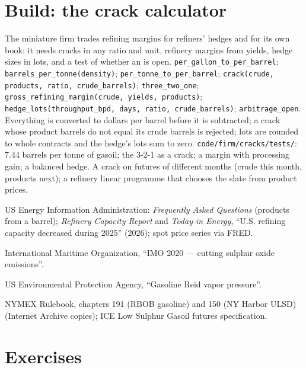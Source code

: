 \section{Build: the crack calculator}\label{bld:m3:refined-products-and-cracks:cracks}

\begin{build}
 The miniature firm trades refining margins for refiners' hedges and
for its own book: it needs cracks in any ratio and unit, refinery margins from yields,
hedge sizes in lots, and a test of whether an  is open.
 \texttt{per\_gallon\_to\_per\_barrel}; \texttt{barrels\_per\_tonne(density)};
\texttt{per\_tonne\_to\_per\_barrel}; \texttt{crack(crude, products, ratio, crude\_barrels)};
\texttt{three\_two\_one}; \texttt{gross\_refining\_margin(crude, yields, products)};
\texttt{hedge\_lots(throughput\_bpd, days, ratio, crude\_barrels)};
\texttt{arbitrage\_open}.
 Everything is converted to dollars per barrel before it is subtracted; a
crack whose product barrels do not equal its crude barrels is rejected; lots are
rounded to whole contracts and the hedge's lots sum to zero.
 \texttt{code/firm/cracks/tests/}: 7.44 barrels per tonne of
gasoil; the 3-2-1 as a crack; a margin with processing gain; a balanced hedge.
 A crack on futures of different months (crude this month, products
next); a refinery linear programme that chooses the slate from product prices.
\end{build}

\begin{omsources}
\item US Energy Information Administration: \emph{Frequently Asked Questions} (products
from a barrel); \emph{Refinery Capacity Report} and \emph{Today in Energy}, ``U.S.
refining capacity decreased during 2025'' (2026); spot price series via FRED.
\item International Maritime Organization, ``IMO 2020 --- cutting sulphur oxide emissions''.
\item US Environmental Protection Agency, ``Gasoline Reid vapor pressure''.
\item NYMEX Rulebook, chapters 191 (RBOB gasoline) and 150 (NY Harbor ULSD) (Internet Archive copies); ICE Low Sulphur Gasoil
futures specification.
\end{omsources}

\section{Exercises}

